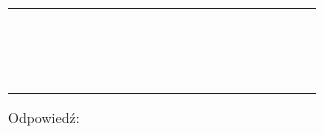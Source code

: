 \documentclass[10pt]{article}
\begin{document}
\begin{center}
\begin{tabular}{|c|c|c|c|c|c|c|c|c|c|c|c|c|c|c|c|c|c|c|c|c|c|}
\hline
 &  &  &  &  &  &  &  &  &  &  &  &  &  &  &  &  &  &  &  &  &  \\
\hline
 &  &  &  &  &  &  &  &  &  &  &  &  &  &  &  &  &  &  &  &  &  \\
\hline
 &  &  &  &  &  &  &  &  &  &  &  &  &  &  &  &  &  &  &  &  &  \\
\hline
 &  &  &  &  &  &  &  &  &  &  &  &  &  &  &  &  &  &  &  &  &  \\
\hline
 &  &  &  &  &  &  &  &  &  &  &  &  &  &  &  &  &  &  &  &  &  \\
\hline
 &  &  &  &  &  &  &  &  &  &  &  &  &  &  &  &  &  &  &  &  &  \\
\hline
 &  &  &  &  &  &  &  &  &  &  &  &  &  &  &  &  &  &  &  &  &  \\
\hline
 &  &  &  &  &  &  &  &  &  &  &  &  &  &  &  &  &  &  &  &  &  \\
\hline
 &  &  &  &  &  &  &  &  &  &  &  &  &  &  &  &  &  &  &  &  &  \\
\hline
 &  &  &  &  &  &  &  &  &  &  &  &  &  &  &  &  &  &  &  &  &  \\
\hline
 &  &  &  &  &  &  &  &  &  &  &  &  &  &  &  &  &  &  &  &  &  \\
\hline
 &  &  &  &  &  &  &  &  &  &  &  &  &  &  &  &  &  &  &  &  &  \\
\hline
 &  &  &  &  &  &  &  &  &  &  &  &  &  &  &  &  &  &  &  &  &  \\
\hline
 &  &  &  &  &  &  &  &  &  &  &  &  &  &  &  &  &  &  &  &  &  \\
\hline
 &  &  &  &  &  &  &  &  &  &  &  &  &  &  &  &  &  &  &  &  &  \\
\hline
 &  &  &  &  &  &  &  &  &  &  &  &  &  &  &  &  &  &  &  &  &  \\
\hline
 &  &  &  &  &  &  &  &  &  &  &  &  &  &  &  &  &  &  &  &  &  \\
\hline
\end{tabular}
\end{center}

Odpowiedź:
\end{document}
